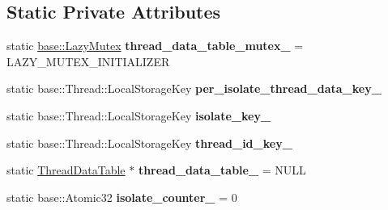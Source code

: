 \subsection*{Static Private Attributes}
\begin{DoxyCompactItemize}
\item 
static \hyperlink{structv8_1_1base_1_1_lazy_instance_impl}{base\+::\+Lazy\+Mutex} {\bfseries thread\+\_\+data\+\_\+table\+\_\+mutex\+\_\+} = L\+A\+Z\+Y\+\_\+\+M\+U\+T\+E\+X\+\_\+\+I\+N\+I\+T\+I\+A\+L\+I\+Z\+ER\hypertarget{classv8_1_1internal_1_1_isolate_af6dcd224785b80475df690f613b79829}{}\label{classv8_1_1internal_1_1_isolate_af6dcd224785b80475df690f613b79829}

\item 
static base\+::\+Thread\+::\+Local\+Storage\+Key {\bfseries per\+\_\+isolate\+\_\+thread\+\_\+data\+\_\+key\+\_\+}\hypertarget{classv8_1_1internal_1_1_isolate_a45052dd41174a2226207fb70ee139237}{}\label{classv8_1_1internal_1_1_isolate_a45052dd41174a2226207fb70ee139237}

\item 
static base\+::\+Thread\+::\+Local\+Storage\+Key {\bfseries isolate\+\_\+key\+\_\+}\hypertarget{classv8_1_1internal_1_1_isolate_a8cdb967d8e8d127107bf4cfa5dba7452}{}\label{classv8_1_1internal_1_1_isolate_a8cdb967d8e8d127107bf4cfa5dba7452}

\item 
static base\+::\+Thread\+::\+Local\+Storage\+Key {\bfseries thread\+\_\+id\+\_\+key\+\_\+}\hypertarget{classv8_1_1internal_1_1_isolate_a6cc0de06391c82a4371d6fc868345e7a}{}\label{classv8_1_1internal_1_1_isolate_a6cc0de06391c82a4371d6fc868345e7a}

\item 
static \hyperlink{classv8_1_1internal_1_1_isolate_1_1_thread_data_table}{Thread\+Data\+Table} $\ast$ {\bfseries thread\+\_\+data\+\_\+table\+\_\+} = N\+U\+LL\hypertarget{classv8_1_1internal_1_1_isolate_a5b44ee432a3bb270a7b30b26ff378c23}{}\label{classv8_1_1internal_1_1_isolate_a5b44ee432a3bb270a7b30b26ff378c23}

\item 
static base\+::\+Atomic32 {\bfseries isolate\+\_\+counter\+\_\+} = 0\hypertarget{classv8_1_1internal_1_1_isolate_a78ca4811158531ace9aaec3134f2c352}{}\label{classv8_1_1internal_1_1_isolate_a78ca4811158531ace9aaec3134f2c352}

\end{DoxyCompactItemize}

